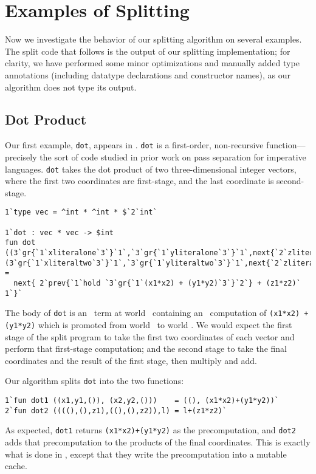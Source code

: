 \section{Examples of Splitting}
\label{sec:examples}

Now we investigate the behavior of our splitting algorithm on several examples.
The split code that follows is the output of our splitting implementation; for
clarity, we have performed some minor optimizations and manually added type
annotations (including datatype declarations and constructor names), as our
algorithm does not type its output.

\subsection{Dot Product}

Our first example, \texttt{dot}, appears in \cite{knoblock96}. \texttt{dot} is a
first-order, non-recursive function---precisely the sort of code studied in
prior work on pass separation for imperative languages. \texttt{dot} takes the
dot product of two three-dimensional integer vectors, where the first two
coordinates are first-stage, and the last coordinate is second-stage. 
%
\begin{lstlisting} 
1`type vec = ^int * ^int * $`2`int`

1`dot : vec * vec -> $int
fun dot ((3`gr{`1`xliteralone`3`}`1`,`3`gr{`1`yliteralone`3`}`1`,next{`2`zliteralone`1`}),(3`gr{`1`xliteraltwo`3`}`1`,`3`gr{`1`yliteraltwo`3`}`1`,next{`2`zliteraltwo`1`})) = 
  next{ 2`prev{`1`hold `3`gr{`1`(x1*x2) + (y1*y2)`3`}`2`} + (z1*z2)` 1`}`
\end{lstlisting}
%
The body of \texttt{dot} is an \rmint\ term at world \bbtwo\ containing an
\rmint\ computation of \texttt{(x1*x2) + (y1*y2)} which is promoted from world
\bbonep\ to world \bbtwo. We would expect the first stage of the split program
to take the first two coordinates of each vector and perform that first-stage
computation; and the second stage to take the final coordinates and the result
of the first stage, then multiply and add.

Our algorithm splits \texttt{dot} into the two functions:
\begin{lstlisting} 
1`fun dot1 ((x1,y1,()), (x2,y2,()))    = ((), (x1*x2)+(y1*y2))`
2`fun dot2 ((((),(),z1),((),(),z2)),l) = l+(z1*z2)`
\end{lstlisting}
%
As expected, \texttt{dot1} returns \texttt{(x1*x2)+(y1*y2)} as the
precomputation, and \texttt{dot2} adds that precomputation to the products of
the final coordinates. This is exactly what is done in \cite{knoblock96}, except
that they write the precomputation into a mutable cache.

